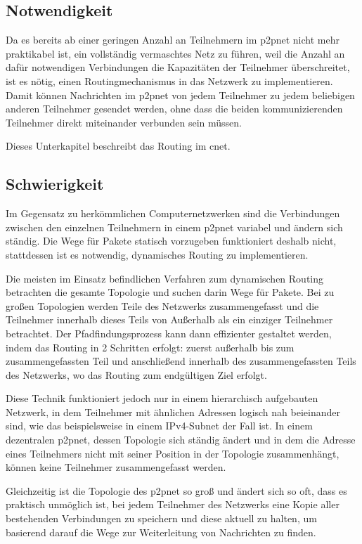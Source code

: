 
\subsection{Notwendigkeit}
Da es bereits ab einer geringen Anzahl an Teilnehmern im \gls{p2pnet} nicht mehr praktikabel ist,
ein vollständig vermaschtes Netz zu führen, weil die Anzahl an dafür notwendigen Verbindungen die
Kapazitäten der Teilnehmer überschreitet, ist es nötig, einen Routingmechanismus in das Netzwerk
zu implementieren. Damit können Nachrichten im \gls{p2pnet} von jedem Teilnehmer zu jedem beliebigen
anderen Teilnehmer gesendet werden, ohne dass die beiden kommunizierenden Teilnehmer direkt
miteinander verbunden sein müssen.

Dieses Unterkapitel beschreibt das Routing im \gls{cnet}.

\subsection{Schwierigkeit}
Im Gegensatz zu herkömmlichen Computernetzwerken sind die Verbindungen zwischen den einzelnen
Teilnehmern in einem \gls{p2pnet} variabel und ändern sich ständig. Die Wege für Pakete statisch
vorzugeben funktioniert deshalb nicht, stattdessen ist es notwendig, dynamisches Routing zu
implementieren.

Die meisten im Einsatz befindlichen Verfahren zum dynamischen Routing betrachten die gesamte
Topologie und suchen darin Wege für Pakete. Bei zu großen Topologien werden Teile des Netzwerks
zusammengefasst und die Teilnehmer innerhalb dieses Teils von Außerhalb als ein einziger Teilnehmer
betrachtet. Der Pfadfindungsprozess kann dann effizienter gestaltet werden, indem das Routing in
2 Schritten erfolgt: zuerst außerhalb bis zum zusammengefassten Teil und anschließend innerhalb
des zusammengefassten Teils des Netzwerks, wo das Routing zum endgültigen Ziel erfolgt.

Diese Technik funktioniert jedoch nur in einem hierarchisch aufgebauten Netzwerk, in dem Teilnehmer
mit ähnlichen Adressen logisch nah beieinander sind, wie das beispielsweise in einem IPv4-Subnet
der Fall ist. In einem dezentralen \gls{p2pnet}, dessen Topologie sich ständig ändert und in dem
die Adresse eines Teilnehmers nicht mit seiner Position in der Topologie zusammenhängt, können
keine Teilnehmer zusammengefasst werden.

Gleichzeitig ist die Topologie des \gls{p2pnet} so groß und ändert sich so oft, dass es praktisch
unmöglich ist, bei jedem Teilnehmer des Netzwerks eine Kopie aller bestehenden Verbindungen zu
speichern und diese aktuell zu halten, um basierend darauf die Wege zur Weiterleitung von
Nachrichten zu finden.


